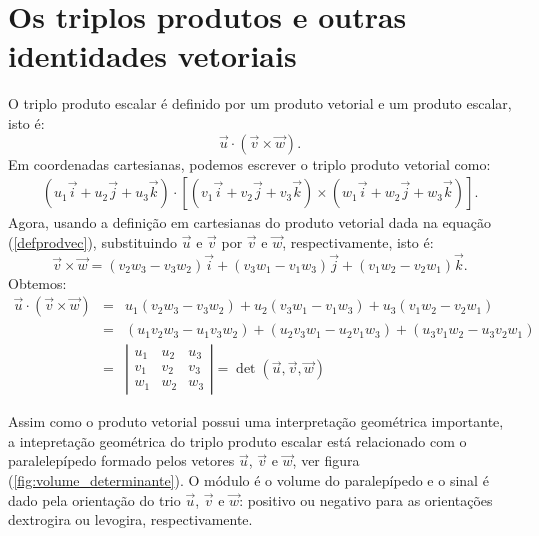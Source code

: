 \section{Os triplos produtos e outras identidades vetoriais}
O triplo produto escalar é definido por um produto vetorial e um produto escalar, isto é:
\begin{equation}
 \vec{u}\cdot (\vec{v}\times \vec{w}).
\end{equation}
Em coordenadas cartesianas, podemos escrever o triplo produto vetorial como:
\begin{eqnarray*}
 \left(u_1\vec{i}+u_2\vec{j}+u_3\vec{k}\right)\cdot \left[\left(v_1\vec{i}+v_2\vec{j}+v_3\vec{k}\right)\times \left(w_1\vec{i}+w_2\vec{j}+w_3\vec{k}\right)\right].
\end{eqnarray*}
Agora, usando a definição em cartesianas do produto vetorial dada na equação (\ref{defprodvec}), substituindo $\vec{u}$ e $\vec{v}$ por $\vec{v}$ e $\vec{w}$, respectivamente, isto é:
\begin{equation*} \vec{v}\times\vec{w}=\left(v_2w_3-v_3w_2\right)\vec{i}+\left(v_3w_1-v_1w_3\right)\vec{j}+\left(v_1w_2-v_2w_1\right)\vec{k}.
\end{equation*}
Obtemos:
\begin{eqnarray}\label{dettriploprod}
  \vec{u}\cdot (\vec{v}\times \vec{w})
 &=&u_1\left(v_2w_3-v_3w_2\right)+u_2\left(v_3w_1-v_1w_3\right)+u_3\left(v_1w_2-v_2w_1\right)\nonumber\\
 &=&\left(u_1v_2w_3-u_1v_3w_2\right)+\left(u_2v_3w_1-u_2v_1w_3\right)+\left(u_3v_1w_2-u_3v_2w_1\right)\nonumber\\
 &=&
 \left|\begin{array}{ccc}
	  u_1&u_2&u_3\\
	  v_1&v_2&v_3\\
	  w_1&w_2&w_3
       \end{array}
 \right|=\det\left(\vec{u},\vec{v},\vec{w}\right)
\end{eqnarray}
\begin{obs}Assim como o produto vetorial possui uma interpretação geométrica importante, a intepretação geométrica do triplo produto escalar está relacionado com o paralelepípedo formado pelos vetores $\vec{u}$, $\vec{v}$ e $\vec{w}$, ver figura (\ref{fig:volume_determinante}). O módulo é o volume do paralepípedo e o sinal é dado pela orientação do trio $\vec{u}$, $\vec{v}$ e $\vec{w}$: positivo ou negativo para as orientações dextrogira ou levogira, respectivamente. \end{obs}
